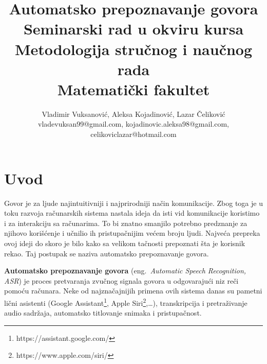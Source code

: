 \documentclass[a4paper]{article}
\begin{document}
\title{Automatsko prepoznavanje govora\\ \small{Seminarski rad u okviru kursa\\Metodologija stručnog i naučnog rada\\Matematički fakultet}}

\author{Vladimir Vuksanović, Aleksa Kojadinović, Lazar Čeliković\\vladevuksan99@gmail.com,  kojadinovic.aleksa98@gmail.com,  \\celikoviclazar@hotmail.com}

\maketitle


\bigskip

\tableofcontents

\newpage

\section{Uvod}
\label{sec:uvod}

Govor je za ljude najintuitivniji i najprirodniji način komunikacije. 
Zbog toga je u toku razvoja računarskih sistema nastala ideja da isti vid komunikacije koristimo i za interakciju sa računarima.
To bi znatno smanjilo potrebno predznanje za njihovo korišćenje i učnilio ih pristupačnijim većem broju ljudi. 
Najveća prepreka ovoj ideji do skoro je bilo kako sa velikom tačnosti prepoznati šta je korisnik rekao.
Taj postupak se naziva automatsko prepoznavanje govora.

\textbf{Automatsko prepoznavanje govora} (eng.~{\em Automatic Speech Recognition, ASR}) je proces pretvaranja zvučnog signala govora u odgovarajući niz reči pomoću računara.
Neke od najznačajnijih primena ovih sistema danas su pametni lični asistenti (Google Assistant\footnote{https://assistant.google.com/}, Apple Siri\footnote{https://www.apple.com/siri/},\dots), transkripcija i pretraživanje audio sadržaja, automatsko titlovanje snimaka i pristupačnost.
\end{document}
